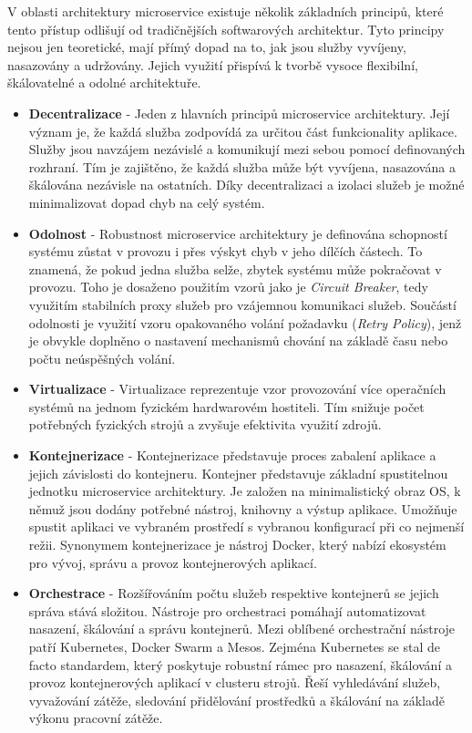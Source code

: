 
V oblasti architektury microservice existuje několik základních principů, které tento přístup odlišují od tradičnějších softwarových architektur. Tyto principy nejsou jen teoretické, mají přímý dopad na to, jak jsou služby vyvíjeny, nasazovány a udržovány. Jejich využití přispívá k tvorbě vysoce flexibilní, škálovatelné a odolné architektuře.

\begin{itemize}
    \item \textbf{Decentralizace} - Jeden z hlavních principů microservice architektury. Její význam je, že každá služba zodpovídá za určitou část funkcionality aplikace. Služby jsou navzájem nezávislé a komunikují mezi sebou pomocí definovaných rozhraní. Tím je zajištěno, že každá služba může být vyvíjena, nasazována a škálována nezávisle na ostatních. Díky decentralizaci a izolaci služeb je možné minimalizovat dopad chyb na celý systém.
    \item \textbf{Odolnost} - Robustnost microservice architektury je definována schopností systému zůstat v provozu i přes výskyt chyb v jeho dílčích částech. To znamená, že pokud jedna služba selže, zbytek systému může pokračovat v provozu. Toho je dosaženo použitím vzorů jako je \emph{Circuit Breaker}, tedy využitím stabilních proxy služeb pro vzájemnou komunikaci služeb. Součástí odolnosti je využití vzoru opakovaného volání požadavku (\emph{Retry Policy}), jenž je obvykle doplněno o nastavení mechanismů chování na základě času nebo počtu neúspěšných volání. 
    \item \textbf{Virtualizace} - Virtualizace reprezentuje vzor provozování více operačních systémů na jednom fyzickém hardwarovém hostiteli. Tím snižuje počet potřebných fyzických strojů a zvyšuje efektivita využití zdrojů.
    \item \textbf{Kontejnerizace} - Kontejnerizace představuje proces zabalení aplikace a jejich závislosti do kontejneru. Kontejner představuje základní spustitelnou jednotku microservice architektury. Je založen na minimalistický obraz OS, k němuž jsou dodány potřebné nástroj, knihovny a výstup aplikace. Umožňuje spustit aplikaci ve vybraném prostředí s vybranou konfigurací při co nejmenší režii. Synonymem kontejnerizace je nástroj Docker, který nabízí ekosystém pro vývoj, správu a provoz kontejnerových aplikací.
    \item \textbf{Orchestrace} - Rozšířováním počtu služeb respektive kontejnerů se jejich správa stává složitou. Nástroje pro orchestraci pomáhají automatizovat nasazení, škálování a správu kontejnerů. Mezi oblíbené orchestrační nástroje patří Kubernetes, Docker Swarm a Mesos. Zejména Kubernetes se stal de facto standardem, který poskytuje robustní rámec pro nasazení, škálování a provoz kontejnerových aplikací v clusteru strojů. Řeší vyhledávání služeb, vyvažování zátěže, sledování přidělování prostředků a škálování na základě výkonu pracovní zátěže.

\end{itemize}
